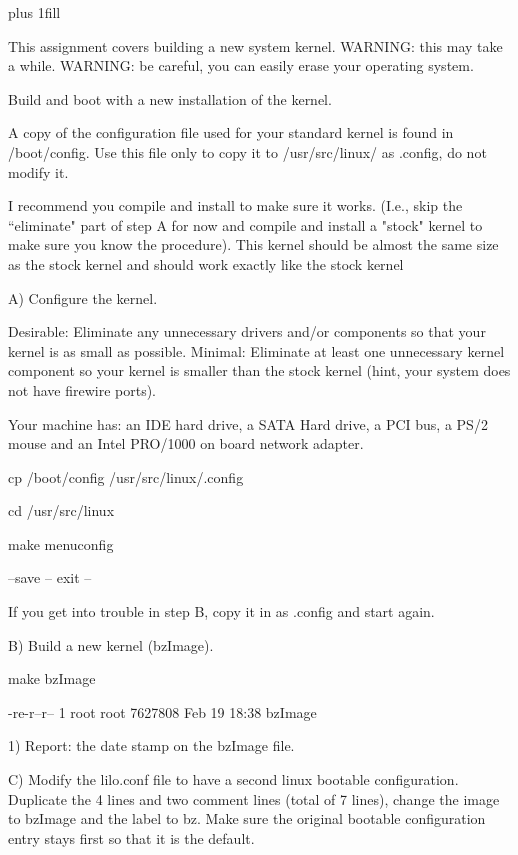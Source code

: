 
\rightskip=0pt plus 1fill

\parindent 0pt

This assignment covers building a new system kernel.
WARNING: this may take a while.
WARNING: be careful, you can easily erase your operating system.

Build and boot with a new installation of the kernel.

A copy of the configuration file used for your standard kernel
is found in {\ltt{}/boot/config}. Use this file only
to copy it to /usr/src/linux/ as {\ltt{}.config}, do not modify it.

I recommend you compile and install to make sure it works.
(I.e., skip the ``eliminate" part of step A for now and compile and
install a "stock" kernel to
make sure you know the procedure).
This kernel should be almost the same size as the stock kernel and should
work exactly like the stock kernel

A) Configure the kernel. 

Desirable:
Eliminate any unnecessary drivers and/or components so that your kernel is
as small as possible.
Minimal: Eliminate at least one unnecessary kernel component so your kernel
is smaller than the stock kernel (hint, your system does not have
firewire ports).


Your machine has:
an IDE hard drive, a SATA Hard drive, a PCI bus, a PS/2 mouse
and
an Intel PRO/1000 on board network adapter.


cp /boot/config /usr/src/linux/.config

cd /usr/src/linux

make menuconfig

--save -- exit --


If you get into trouble in step B, copy it in as {\ltt{}.config}
and start again.

B) Build a new kernel ({\ltt{}bzImage}).

make bzImage

-re-r--r-- 1 root root 7627808 Feb 19 18:38 bzImage

1) Report: the date stamp on the bzImage file.

C) Modify the {\ltt{}lilo.conf} file to have a second linux
bootable configuration.
Duplicate the 4 lines and two comment lines (total of 7 lines),
change the image to {\ltt{}bzImage} and the label to {\ltt{}bz}.
Make sure the original bootable configuration entry stays first so that
it is the default.

